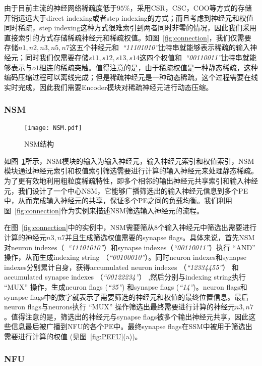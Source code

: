由于目前主流的神经网络稀疏度低于$95\%$，采用CSR，CSC，COO等方式的存储开销远远大于direct indexing或者step indexing的方式；而且考虑到神经元和权值同时稀疏，step indexing这种方式很难索引到两者同时非零的情况，因此我们采用直接索引的方式存储稀疏神经元和稀疏权值。如图~\ref{fig:connection}，我们仅需要存储$n1, n2, n3, n5, n7$这五个神经元和~\emph{“11101010”}比特串就能够表示稀疏的输入神经元；同时我们仅需要存储$s11, s12, s13, s14$这四个权值和~\emph{“00110011”}比特串就能够表示与$o1$相连的稀疏突触。值得注意的是，由于稀疏权值是一种静态稀疏，这种编码压缩过程可以离线完成；但是稀疏神经元是一种动态稀疏，这个过程需要在线实时完成，因此我们需要Encoder模块对稀疏神经元进行动态压缩。

\subsubsection{NSM}
\begin{figure}[h]
\centering
\texttt{[image: NSM.pdf]}
\caption{NSM结构}
\label{fig:NSM}
\end{figure}

如图~\ref{fig:NSM}所示，NSM模块的输入为输入神经元，输入神经元索引和权值索引，NSM模块通过神经元索引和权值索引筛选需要进行计算的输入神经元来处理静态稀疏。为了更有效地利用粗粒度稀疏特性，即多个相邻的输出神经元共享索引和输入神经元，我们设计了一个中心NSM，它能够广播筛选出的输入神经元信息到多个PE中，从而完成输入神经元的共享，保证多个PE之间的负载均衡。我们利用图~\ref{fig:connection}作为实例来描述NSM筛选输入神经元的流程。

在图~\ref{fig:connection}中的实例中，NSM需要筛从8个输入神经元中筛选出需要进行计算的神经元$n3, n7$并且生成筛选权值需要的synapse flags。具体来说，首先NSM对neuron indexes（~\emph{“11101010”}）和synapse indexes（\emph{“00110011”}）执行 “AND” 操作，从而生成indexing string （\emph{“00100010”}）。同时neuron indexes和synapse indexes分别累计自身，获得accumulated neuron indexes （\emph{“12334455”}） 和accumulated synapse indexes （\emph{“00122234”}） ,然后分别与indexing string执行 “MUX” 操作，生成neuron flags (\emph{“35”}) 和synapse flags (\emph{“14”})。neuron flags和synapse flags中的数字就表示了需要筛选的神经元和权值的最终位置信息。最后neuron flags与neurons执行 “MUX” 操作筛选出最终需要进行计算的神经元$n3, n7$。值得注意的是，筛选出的神经元与synapse flags被多个输出神经元共享，因此这些信息最后被广播到NFU的各个PE中。最终synapse flags在SSM中被用于筛选出需要进行计算的权值 (见图~\ref{fig:PEFU}(a))。

\subsubsection{NFU}

